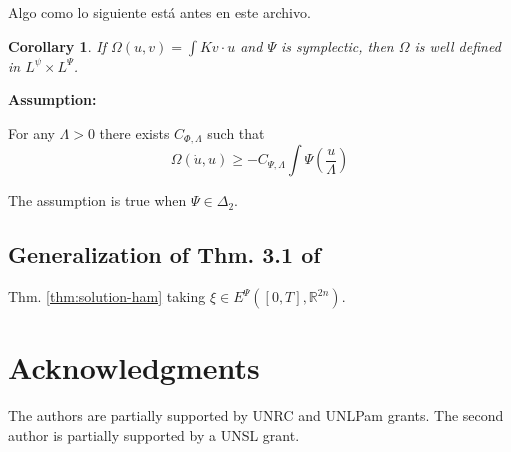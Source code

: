 \documentclass[twoside]{article}
\newtheorem{cor}[thm]{Corollary}
\theoremstyle{remark}
\newcommand{\rr}{\mathbb{R}}
\renewcommand{\geq}{\geqslant}
\begin{document}
Algo como lo siguiente est\'a antes en este archivo. 

\begin{cor}
If $
\Omega(u,v)=\int Kv\cdot u
$
and $\Psi$ is symplectic, then $\Omega$ is well defined in $L^{\psi} \times L^{\Psi}$.
\end{cor}

{ \bf Assumption:}
 
For any $\Lambda>0$ there exists $C_{\Phi,\Lambda}$ such that
\[
\Omega(\dot{u},u)\geq -C_{\Psi,\Lambda} \int \Psi\left(\frac{u}{\Lambda}\right)
\]

The assumption is true when $\Psi \in \Delta_2$.

\subsection{
Generalization of Thm. 3.1 of \cite{mawhin2010critical}}

Thm. \ref{thm:solution-ham} taking $\xi \in E^{\Psi}([0,T],\rr^{2n})$.



\section*{Acknowledgments}
The authors are partially supported by  UNRC and UNLPam grants. The second author is  partially supported by a  UNSL grant. 




% 
 
 

\end{document}

